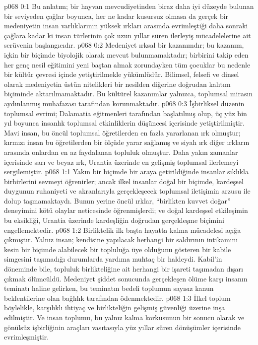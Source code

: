 \vs p068 0:1 Bu anlatım; bir hayvan mevcudiyetinden biraz daha iyi düzeyde bulunan bir seviyeden çağlar boyunca, her ne kadar kusursuz olmasa da gerçek bir medeniyetin insan varlıklarının yüksek ırkları arasında evrimleştiği daha sonraki çağlara kadar ki insan türlerinin çok uzun yıllar süren ilerleyiş mücadelelerine ait serüvenin başlangıcıdır.
\vs p068 0:2 Medeniyet ırksal bir kazanımdır; bu kazanım, içkin bir biçimde biyolojik olarak mevcut bulunmamaktadır; birbirini takip eden her genç nesil eğitimini yeni baştan almak zorundayken tüm çocuklar bu nedenle bir kültür çevresi içinde yetiştirilmekle yükümlüdür. Bilimsel, felsefi ve dinsel olarak medeniyetin üstün nitelikleri bir nesilden diğerine doğrudan kalıtım biçiminde aktarılmamaktadır. Bu kültürel kazanımlar yalnızca, toplumsal mirasın aydınlanmış muhafazası tarafından korunmaktadır.
\vs p068 0:3 İşbirliksel düzenin toplumsal evrimi; Dalamatia eğitmenleri tarafından başlatılmış olup, üç yüz bin yıl boyunca insanlık toplumsal etkinliklerin düşüncesi içerisinde yetiştirilmiştir. Mavi insan, bu öncül toplumsal öğretilerden en fazla yararlanan ırk olmuştur; kırmızı insan bu öğretilerden bir ölçüde yarar sağlamış ve siyah ırk diğer ırkların arasında onlardan en az faydalanan topluluk olmuştur. Daha yakın zamanlar içerisinde sarı ve beyaz ırk, Urantia üzerinde en gelişmiş toplumsal ilerlemeyi sergilemiştir.
\vs p068 1:1 Yakın bir biçimde bir araya getirildiğinde insanlar sıklıkla birbirlerini sevmeyi öğrenirler; ancak ilkel insanlar doğal bir biçimde, kardeşsel duygunun ruhaniyeti ve akranlarıyla gerçekleşecek toplumsal iletişimin arzusu ile dolup taşmamaktaydı. Bunun yerine öncül ırklar, “birlikten kuvvet doğar” deneyimini kötü olaylar neticesinde öğrenmişlerdi; ve doğal kardeşsel etkileşimin bu eksikliği, Urantia üzerinde kardeşliğin doğrudan gerçekleşme biçimini engellemektedir.
\vs p068 1:2 Birliktelik ilk başta hayatta kalma mücadelesi açığa çıkmıştır. Yalnız insan; kendisine yapılacak herhangi bir saldırının intikamını kesin bir biçimde alabilecek bir topluluğa üye olduğunu gösteren bir kabile simgesini taşımadığı durumlarda yardıma muhtaç bir haldeydi. Kabil’in döneminde bile, topluluk birlikteliğine ait herhangi bir işareti taşımadan dışarı çıkmak ölümcüldü. Medeniyet şiddet sonucunda gerçekleşen ölüme karşı insanın teminatı haline gelirken, bu teminatın bedeli toplumun sayısız kanun beklentilerine olan bağlılık tarafından ödenmektedir.
\vs p068 1:3 İlkel toplum böylelikle, karşılıklı ihtiyaç ve birlikteliğin gelişmiş güvenliği üzerine inşa edilmiştir. Ve insan toplumu, bu yalnız kalma korkusunun bir sonucu olarak ve gönülsüz işbirliğinin araçları vasıtasıyla yüz yıllar süren dönüşümler içerisinde evrimleşmiştir.
